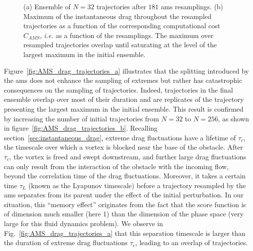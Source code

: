 \documentclass{jfm}
\begin{document}
\begin{figure}
  \centering
  \caption{(a) Ensemble of $N = 32$ trajectories after $181$ \ac{ams} resamplings.
    (b) Maximum of the instantaneous drag throughout the resampled trajectories as a function of the corresponding computational cost $C_{AMS}$, \textit{i.e.} as a function of the resamplings. The maximum over resampled trajectories overlap until saturating at the level of the largest maximum in the initial ensemble.
  }
\end{figure}

Figure~\ref{fig:AMS_drag_trajectories_a} illustrates that the splitting introduced by the \ac{ams} does not enhance the sampling of extremes but rather has catastrophic consequences on the sampling of trajectories.
Indeed, trajectories in the final ensemble overlap over most of their duration and are replicates of the trajectory presenting the largest maximum in the initial ensemble.
This result is confirmed by increasing the number of initial trajectories from $N=32$ to $N=256$, as shown
in figure~\ref{fig:AMS_drag_trajectories_b}.
Recalling section~\ref{sec:instantaneous_drag}, extreme drag fluctuations have a lifetime of $\tau_c$, the timescale over which a vortex is blocked near the base of the obstacle.
After $\tau_c$, the vortex is freed and swept downstream, and further large drag fluctuations can only result from the interaction of the obstacle with the incoming flow, beyond the correlation time of the drag fluctuations.
Moreover, it takes a certain time $\tau_L$ (known as the Lyapunov timescale) before a trajectory resampled by the \ac{ams} separates from its parent under the effect of the initial perturbation.
In our situation, this ``memory effect'' originates from the fact that the score function is of dimension much smaller (here 1) than the dimension of the phase space (very large for this fluid dynamics problem).
%
We observe in Fig.~\ref{fig:AMS_drag_trajectories_a} that this separation timescale is larger than the duration of extreme drag fluctuations $\tau_c$, leading to an overlap of trajectories.
\end{document}
